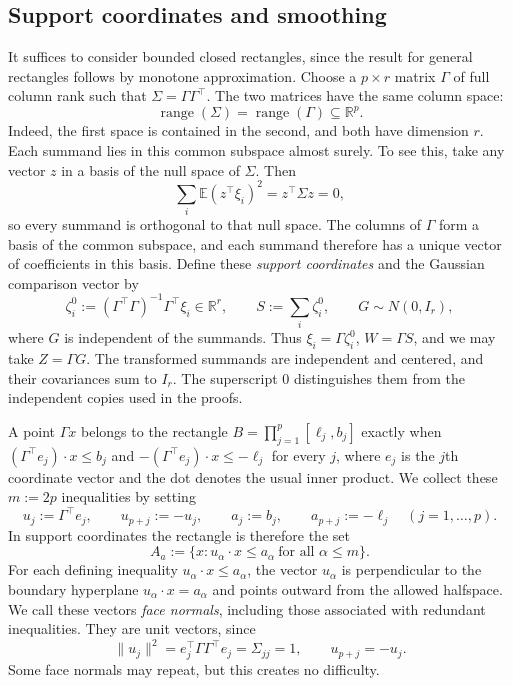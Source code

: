 \documentclass[11pt,letterpaper,twoside,leqno]{article}
\theoremstyle{bookplain}
\theoremstyle{bookremark}
\newcommand{\E}{\mathbb E}
\newcommand{\R}{\mathbb R}
\begin{document}
\subsection{Support coordinates and smoothing}\label{sec:outline-smoothing}
It suffices to consider bounded closed rectangles, since the result for
general rectangles follows by monotone approximation. Choose a \(p\times r\)
matrix \(\Gamma\) of full column rank such that \(\Sigma=\Gamma\Gamma^\top\).
The two matrices have the same column space:
\[
 \operatorname{range}(\Sigma)=\operatorname{range}(\Gamma)\subseteq\R^p.
\]
Indeed, the first space is contained in the second, and both have dimension
\(r\). Each summand lies in this common subspace almost surely. To see this,
take any vector \(z\) in a basis of the null space of \(\Sigma\). Then
\[
 \sum_i\E(z^\top\xi_i)^2=z^\top\Sigma z=0,
\]
so every summand is orthogonal to that null space. The columns of \(\Gamma\)
form a basis of the common subspace, and each summand therefore has a unique
vector of coefficients in this basis. Define these \emph{support coordinates}
and the Gaussian comparison vector by
\[
 \zeta_i^0:=(\Gamma^\top\Gamma)^{-1}\Gamma^\top\xi_i\in\R^r,\qquad
 S:=\sum_i\zeta_i^0,\qquad G\sim N(0,I_r),
\]
where \(G\) is independent of the summands. Thus \(\xi_i=\Gamma\zeta_i^0\),
\(W=\Gamma S\), and we may take \(Z=\Gamma G\).
The transformed summands are independent and centered, and their
covariances sum to \(I_r\). The superscript \(0\) distinguishes them
from the independent copies used in the proofs.

A point \(\Gamma x\) belongs to the rectangle
\(B=\prod_{j=1}^p[\ell_j,b_j]\) exactly when
\((\Gamma^\top e_j)\cdot x\le b_j\) and
\(-(\Gamma^\top e_j)\cdot x\le-\ell_j\) for every \(j\), where \(e_j\)
is the \(j\)th coordinate vector and the dot denotes the usual inner product.
We collect these \(m:=2p\)
inequalities by setting
\[
 u_j:=\Gamma^\top e_j,\qquad u_{p+j}:=-u_j,\qquad
 a_j:=b_j,\qquad a_{p+j}:=-\ell_j\quad (j=1,\ldots,p).
\]
In support coordinates the rectangle is therefore the set
\[
 A_a:=\{x:u_\alpha\cdot x\le a_\alpha\ \text{for all }\alpha\le m\}.
\]
For each defining inequality \(u_\alpha\cdot x\le a_\alpha\), the vector
\(u_\alpha\) is perpendicular to the boundary hyperplane
\(u_\alpha\cdot x=a_\alpha\) and points outward from the allowed halfspace.
We call these vectors \emph{face normals}, including those associated
with redundant inequalities. They are unit vectors, since
\[
 \|u_j\|^2=e_j^\top\Gamma\Gamma^\top e_j=\Sigma_{jj}=1,
 \qquad u_{p+j}=-u_j.
\]
Some face normals may repeat, but this creates no difficulty.
\end{document}
